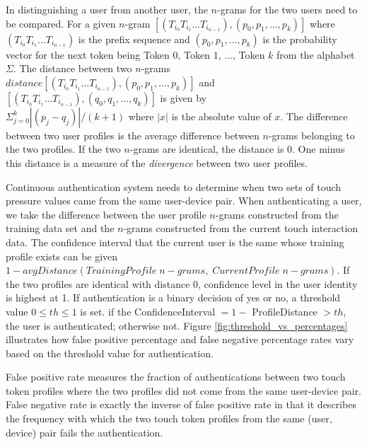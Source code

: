\documentclass{acm_proc_article-sp}
\begin{document}
In distinguishing a user from another user, 
the $n$-grams for the two users need to be compared. 
For a given $n$-gram 
$[(T_{i_0} T_{i_1} \dots T_{i_{n-1}}), (p_0, p_1, \dots, p_k)]$ where 
$(T_{i_0} T_{i_1} \dots T_{i_{n-1}})$ is the prefix sequence and 
$(p_0, p_1, \dots, p_k)$ is the
probability vector for the next token being 
Token $0$, Token $1$, ..., Token $k$ from the alphabet $\Sigma$.
The distance between two $n$-grams $distance[(T_{i_0} T_{i_1} \dots T_{i_{n-1}}), (p_0, p_1, \dots, p_k)]$
and \\
$[(T_{i_0} T_{i_1} \dots T_{i_{n-1}}), (q_0, q_1, \dots, q_k)]$ is
given by \\
$\Sigma_{j=0}^k|(p_j - q_j)|/(k+1)$ where $|x|$ is the absolute value of $x$.
The difference between two user profiles is the average difference between $n$-grams belonging
to the two profiles. If the two $n$-grams are identical, the distance is 0.
One minus this distance is a measure of the {\it divergence} between two user profiles.

Continuous authentication system needs to determine when two sets of touch pressure values came from the same user-device pair. When authenticating a user, we take the difference between
the user profile $n$-grams constructed from the training data set and the $n$-grams
constructed from the current touch interaction data. The confidence interval
that the current user is the same whose training profile exists can be given $1 - 
avgDistance(TrainingProfile \; n-grams, \; CurrentProfile \; n-grams)$. If the two profiles are
identical with distance 0, confidence level in the user identity is highest at 1.
%
If authentication is a binary decision of yes or no, a threshold value $0 \leq th \leq 1$ is set.
if the ConfidenceInterval $= 1 -$ ProfileDistance $> th$, the user is authenticated; otherwise not. 
Figure \ref{fig:threshold_vs_percentages} illustrates how false positive percentage and false negative percentage rates vary based on the threshold value for authentication. 


False positive rate measures the fraction of authentications between two touch token profiles where 
the two profiles did not come from the same user-device pair.
False negative rate is exactly the inverse of false positive rate in that it describes the
frequency with which the two touch token profiles from the same (user, device) pair fails the authentication. 
\end{document}
